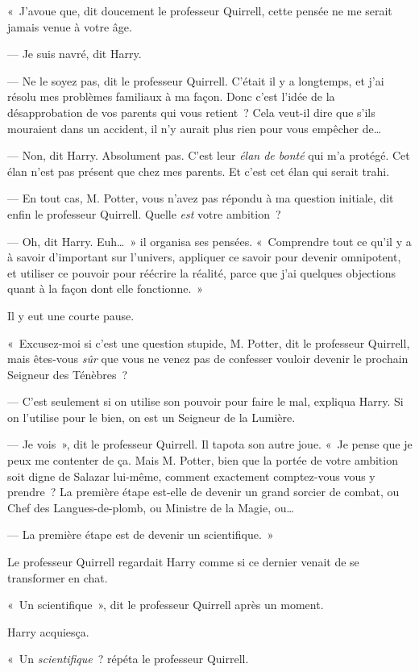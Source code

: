 «~J'avoue que, dit doucement le professeur Quirrell, cette pensée ne me serait jamais venue à votre âge.

--- Je suis navré, dit Harry.

--- Ne le soyez pas, dit le professeur Quirrell.
C'était il y a longtemps, et j'ai résolu mes problèmes familiaux à ma façon.
Donc c'est l'idée de la désapprobation de vos parents qui vous retient~?
Cela veut-il dire que s'ils mouraient dans un accident, il n'y aurait plus rien pour vous empêcher de…

--- Non, dit Harry.
Absolument pas.
C'est leur \emph{élan de bonté} qui m'a protégé.
Cet élan n'est pas présent que chez mes parents.
Et c'est cet élan qui serait trahi.

--- En tout cas, M. Potter, vous n'avez pas répondu à ma question initiale, dit enfin le professeur Quirrell.
Quelle \emph{est} votre ambition~?

--- Oh, dit Harry.
Euh…~» il organisa ses pensées.
«~Comprendre tout ce qu'il y a à savoir d'important sur l'univers, appliquer ce savoir pour devenir omnipotent, et utiliser ce pouvoir pour réécrire la réalité, parce que j'ai quelques objections quant à la façon dont elle fonctionne.~»

Il y eut une courte pause.

«~Excusez-moi si c'est une question stupide, M. Potter, dit le professeur Quirrell, mais êtes-vous \emph{sûr} que vous ne venez pas de confesser vouloir devenir le prochain Seigneur des Ténèbres~?

--- C'est seulement si on utilise son pouvoir pour faire le mal, expliqua Harry.
Si on l'utilise pour le bien, on est un Seigneur de la Lumière.

--- Je vois~», dit le professeur Quirrell.
Il tapota son autre joue.
«~Je pense que je peux me contenter de ça.
Mais M. Potter, bien que la portée de votre ambition soit digne de Salazar lui-même, comment exactement comptez-vous vous y prendre~?
La première étape est-elle de devenir un grand sorcier de combat, ou Chef des Langues-de-plomb, ou Ministre de la Magie, ou…

--- La première étape est de devenir un scientifique.~»

Le professeur Quirrell regardait Harry comme si ce dernier venait de se transformer en chat.

«~Un scientifique~», dit le professeur Quirrell après un moment.

Harry acquiesça.

«~Un \emph{scientifique}~? répéta le professeur Quirrell.

